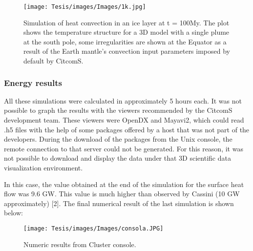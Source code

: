 \documentclass[../main.tex]{subfiles}
\begin{document}
\begin{figure}[h]
    \centering
    \texttt{[image: Tesis/images/Images/1k.jpg]}
    \label{fig:my_label}
    \centering
    \caption{Simulation of heat convection in an ice layer at t = 100My. The plot shows the temperature structure for a 3D model with a single plume at the south pole, some irregularities are shown at the Equator as a result of the Earth mantle's convection input parameters imposed by default by CitcomS.}
\end{figure}







\subsubsection{Energy results}

All these simulations were calculated in approximately 5 hours each. It was not possible to graph the results with the viewers recommended by the CitcomS development team. These viewers were OpenDX and Mayavi2, which could read .h5 files with the help of some packages offered by a host that was not part of the developers. During the download of the packages from the Unix console, the remote connection to that server could not be generated. For this reason, it was not possible to download and display the data under that 3D scientific data visualization environment.



In this case, the value obtained at the end of the simulation for the surface heat flow was 9.6 GW. This value is much higher than observed by Cassini (10 GW approximately) [2]. The final numerical result of the last simulation is shown below:

\vspace{1cm}

\begin{figure}[h]
    \centering
    \texttt{[image: Tesis/images/Images/consola.JPG]}
    \label{fig:my_label}
    \centering
    \caption{Numeric results from Cluster console.}
\end{figure}
\end{document}
